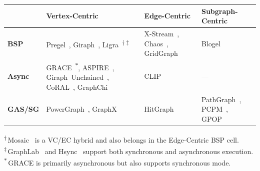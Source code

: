 \begin{tabularx}{\textwidth}{l Y Y Y}
\toprule
& \textbf{Vertex-Centric} & \textbf{Edge-Centric} & \textbf{Subgraph-Centric} \\
\midrule

\textbf{BSP}
  & \mbox{Pregel~\cite{malewicz2010pregel}}, \mbox{Giraph~\cite{giraph}}, \mbox{Ligra~\cite{shun2013ligra}\textsuperscript{$\dagger\ddagger$}}
  & \mbox{X-Stream~\cite{roy2013x}}, \mbox{Chaos~\cite{royChaos2015}}, \mbox{GridGraph~\cite{zhu2015gridgraph}}
  & \mbox{Blogel~\cite{yan2014blogel}} \tabularnewline

\textbf{Async}
  & \mbox{GRACE~\cite{wang2013asynchronous}\textsuperscript{$*$}}, \mbox{ASPIRE~\cite{vora2014aspire}}, \mbox{Giraph Unchained~\cite{han2015giraph}}, \mbox{CoRAL~\cite{vora2017coral}}, \mbox{GraphChi~\cite{kyrola2012graphchi}}
  & \mbox{CLIP~\cite{ai2018clip}}
  & --- \tabularnewline

\textbf{GAS/SG}
  & \mbox{PowerGraph~\cite{gonzalez2012powergraph}}, \mbox{GraphX~\cite{gonzalez2014graphx}}
  & \mbox{HitGraph~\cite{zhou2018fpga}}
  & \mbox{PathGraph~\cite{yuan2016pathgraph}}, \mbox{PCPM~\cite{lakhotia2018accelerating}}, \mbox{GPOP~\cite{lakhotia2020gpop}} \tabularnewline

\bottomrule
\end{tabularx}

\vspace{4pt}
{\small
\textsuperscript{$\dagger$}\,Mosaic~\cite{maass2017mosaic} is a VC/EC hybrid and also belongs in the Edge-Centric BSP cell.\\
\textsuperscript{$\ddagger$}\,GraphLab~\cite{low2014graphlab} and Hsync~\cite{Xie2015Hsync} support both synchronous and asynchronous execution.\\
\textsuperscript{$*$}\,GRACE is primarily asynchronous but also supports synchronous mode.
}
